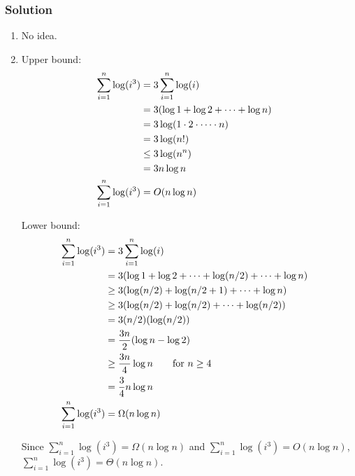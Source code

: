\subsubsection{Solution}

\begin{enumerate}
	\item No idea.  
	\item 
Upper bound:
\begin{align*}
	\sum_{i=1}^n \log(i^3) &= 3 \sum_{i=1}^n \log(i) \cr
		&= 3 ( \log 1 + \log 2 + \cdots + \log n) \cr
		&= 3\log(1 \cdot 2 \cdot \cdots \cdot n) \cr
		&= 3 \log(n!) \cr
		&\le 3 \log(n^n) \cr
		&= 3n \log n \cr
		\sum_{i=1}^n \log(i^3) &= O(n \log n) \cr
\end{align*}

Lower bound:  
\begin{align*}
	\sum_{i=1}^n \log(i^3) &= 3 \sum_{i=1}^n \log(i) \cr
		&= 3 ( \log 1 + \log 2 + \cdots + \log(n/2) + \cdots + \log n) \cr
		&\ge 3(\log(n/2) + \log(n/2+1) + \cdots + \log n) \cr
		&\ge 3(\log(n/2) + \log(n/2) + \cdots + \log(n/2)) \cr
		&= 3(n/2)(\log(n/2)) \cr
		&= \frac{3n}{2}(\log n - \log 2) \cr
		&\ge \frac{3n}{4}\log n \text{\qquad for } n\ge 4 \cr
		&= \frac{3}{4} n \log n \cr
	\sum_{i=1}^n \log(i^3) &= \Omega(n \log n) \cr
\end{align*}

Since $\displaystyle \sum_{i=1}^n \log(i^3) = \Omega(n \log n)$ and 
$\displaystyle \sum_{i=1}^n \log(i^3) = O(n \log n)$, 
$\displaystyle \sum_{i=1}^n \log(i^3) = \Theta(n \log n)$.
\end{enumerate}



